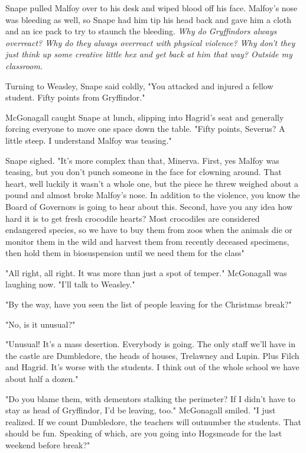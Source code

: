 Snape pulled Malfoy over to his desk and wiped blood off his face. Malfoy's nose was bleeding as well, so Snape had him tip his head back and gave him a cloth and an ice pack to try to staunch the bleeding. \emph{Why do Gryffindors always overreact? Why do they always overreact with physical violence? Why don't they just think up some creative little hex and get back at him that way? Outside my classroom.}

Turning to Weasley, Snape said coldly, "You attacked and injured a fellow student. Fifty points from Gryffindor."

McGonagall caught Snape at lunch, slipping into Hagrid's seat and generally forcing everyone to move one space down the table. "Fifty points, Severus? A little steep. I understand Malfoy was teasing."

Snape sighed. "It's more complex than that, Minerva. First, yes Malfoy was teasing, but you don't punch someone in the face for clowning around. That heart, well luckily it wasn't a whole one, but the piece he threw weighed about a pound and almost broke Malfoy's nose. In addition to the violence, you know the Board of Governors is going to hear about this. Second, have you any idea how hard it is to get fresh crocodile hearts? Most crocodiles are considered endangered species, so we have to buy them from zoos when the animals die or monitor them in the wild and harvest them from recently deceased specimens, then hold them in biosuspension until we need them for the class{\el}"

"All right, all right. It was more than just a spot of temper." McGonagall was laughing now. "I'll talk to Weasley."

"By the way, have you seen the list of people leaving for the Christmas break?"

"No, is it unusual?"

"Unusual! It's a mass desertion. Everybody is going. The only staff we'll have in the castle are Dumbledore, the heads of houses, Trelawney and{\el} Lupin. Plus Filch and Hagrid. It's worse with the students. I think out of the whole school we have about half a dozen."

"Do you blame them, with dementors stalking the perimeter? If I didn't have to stay as head of Gryffindor, I'd be leaving, too." McGonagall smiled. "I just realized. If we count Dumbledore, the teachers will outnumber the students. That should be fun. Speaking of which, are you going into Hogsmeade for the last weekend before break?"

